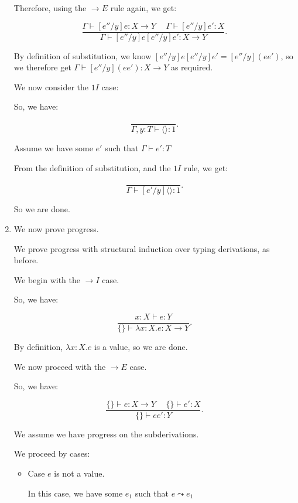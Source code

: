 \begin{enumerate}
      Therefore, using the $\rightarrow E$ rule again, we get:

      \[
        \frac{\Gamma \vdash [e'' / y]e : X \rightarrow Y \hspace{15pt} \Gamma \vdash [e'' / y]e' : X}{\Gamma \vdash [e'' / y]e [e'' / y]e' : X \rightarrow Y}
      .\] 

      By definition of substitution, we know $[e'' / y]e [e'' / y]e' = [e'' / y](e e')$, so we therefore get $\Gamma \vdash [e'' / y](e e') : X \rightarrow Y$ as required.

      We now consider the $1I$ case:

      So, we have:

      \[
        \frac{}{\Gamma, y : T \vdash \langle\rangle : 1}
      .\] 

      Assume we have some $e'$ such that $\Gamma \vdash e' : T$

      From the definition of substitution, and the $1I$ rule, we get:

      \[
        \frac{}{\Gamma \vdash [e' / y]\langle\rangle : 1}
      .\] 

      So we are done.

    \item
      We now prove progress.

      We prove progress with structural induction over typing derivations, as before.

      We begin with the $\rightarrow I$ case.

      So, we have:

      \[
        \frac{x : X \vdash e : Y}{\{\} \vdash \lambda x : X. e : X \rightarrow Y}
      .\] 

      By definition, $\lambda x : X .e$ is a value, so we are done.

      We now proceed with the $\rightarrow E$ case.

      So, we have:

      \[
        \frac{\{\} \vdash e : X \rightarrow Y \hspace{15pt} \{\} \vdash e' : X}{\{\} \vdash e e' : Y}
      .\] 

      We assume we have progress on the subderivations.

      We proceed by cases:

      \begin{itemize}
        \item
          Case $e$ is not a value.

          In this case, we have some $e_1$ such that $e \leadsto e_1$


\end{itemize}
\end{enumerate}
